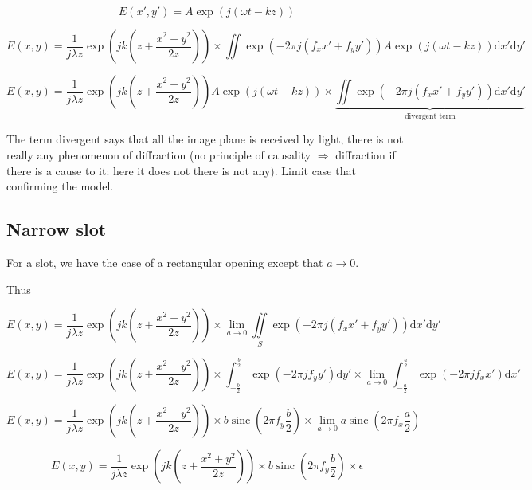 \documentclass[10pt,a4paper]{article}
\DeclareMathOperator{\sinc}{sinc}
\begin{document}
\[E(x',y')=A\exp\left(j(\omega t-kz)\right)\]

\[
E(x,y)=\frac{1}{j\lambda z} \exp\left(jk\left(z+\frac{x^2+y^2}{2z}\right)\right)
\times \iint \exp\left(-2\pi j(f_xx'+f_yy')\right)
A\exp\left(j(\omega t-kz)\right)\mathrm{d}x'\mathrm{d}y'
\]

\[
E(x,y)=\frac{1}{j\lambda z} \exp\left(jk\left(z+\frac{x^2+y^2}{2z}\right)\right) A\exp\left(j(\omega t-kz)\right)
\times \underbrace{
	\iint \exp\left(-2\pi j(f_xx'+f_yy')\right)
	\mathrm{d}x'\mathrm{d}y'
}_\text{divergent term}
\]

The term divergent says that all the image plane is received by light, there is not really any phenomenon of diffraction (no principle of causality $\Rightarrow$ diffraction if there is a cause to it: here it does not there is not any). Limit case that confirming the model.

	\subsection{Narrow slot}
For a slot, we have the case of a rectangular opening except that $a\rightarrow 0$.

Thus
	
\[
E(x,y)=\frac{1}{j\lambda z} \exp\left(jk\left(z+\frac{x^2+y^2}{2z}\right)\right)
\times \lim_{a\rightarrow 0} \iint\limits_S \exp\left(-2\pi j(f_xx'+f_yy')\right)\mathrm{d}x'\mathrm{d}y'
\]

\[
E(x,y)=\frac{1}{j\lambda z} \exp\left(jk\left(z+\frac{x^2+y^2}{2z}\right)\right)
\times \int_{-\frac{b}{2}}^\frac{b}{2} \exp\left(-2\pi jf_yy'\right)\mathrm{d}y'
\times \lim_{a\rightarrow 0} \int_{-\frac{a}{2}}^\frac{a}{2} \exp\left(-2\pi jf_xx'\right)\mathrm{d}x'
\]

\[
E(x,y)=\frac{1}{j\lambda z} \exp\left(jk\left(z+\frac{x^2+y^2}{2z}\right)\right)
\times b\sinc\left(2\pi f_y \frac{b}{2}\right)
\times \lim_{a\rightarrow 0}a\sinc\left(2\pi f_x \frac{a}{2}\right)
\]

\[
E(x,y)=\frac{1}{j\lambda z} \exp\left(jk\left(z+\frac{x^2+y^2}{2z}\right)\right)
\times b\sinc\left(2\pi f_y \frac{b}{2}\right)
\times \epsilon
\]
\end{document}
